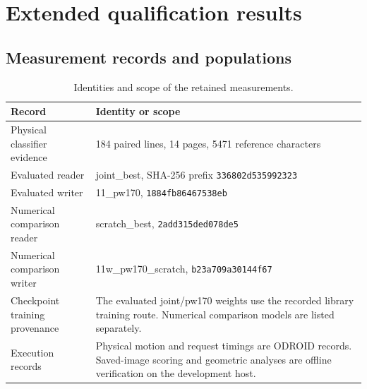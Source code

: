 \section{Extended qualification results}\label{app:res-evidence}
\subsection{Measurement records and populations}\label{app:res-provenance}
\begin{table}[H]\centering\small
\begin{tabular}{p{.34\linewidth}p{.58\linewidth}}
\toprule Record & Identity or scope\\\midrule
Physical classifier evidence & 184 paired lines, 14 pages, 5471 reference characters\\
Evaluated reader & joint\_best, SHA-256 prefix \texttt{336802d535992323}\\
Evaluated writer & 11\_pw170, \texttt{1884fb86467538eb}\\
Numerical comparison reader & scratch\_best, \texttt{2add315ded078de5}\\
Numerical comparison writer & 11w\_pw170\_scratch, \texttt{b23a709a30144f67}\\
Checkpoint training provenance & The evaluated joint/pw170 weights use the recorded library training route. Numerical comparison models are listed separately.\\
Execution records & Physical motion and request timings are ODROID records. Saved-image scoring and geometric analyses are offline verification on the development host.\\
\bottomrule\end{tabular}
\caption{Identities and scope of the retained measurements.}\label{tab:app-checkpoints}\end{table}
